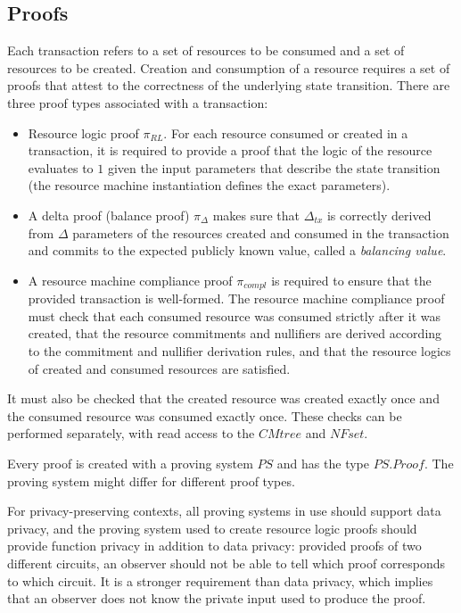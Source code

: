 \subsection{Proofs}

Each transaction refers to a set of resources to be consumed and a set of resources to be created. Creation and consumption of a resource requires a set of proofs that attest to the correctness of the underlying state transition. There are three proof types associated with a transaction:
\begin{itemize}
    \item Resource logic proof $\pi_{RL}$. For each resource consumed or created in a transaction, it is required to provide a proof that the logic of the resource evaluates to $1$ given the input parameters that describe the state transition (the resource machine instantiation defines the exact parameters).
    \item A delta proof (balance proof) $\pi_{\Delta}$ makes sure that $\Delta_{tx}$ is correctly derived from $\Delta$ parameters of the resources created and consumed in the transaction and commits to the expected publicly known value, called a \textit{balancing value}. 
    \item A resource machine compliance proof $\pi_{compl}$ is required to ensure that the provided transaction is well-formed. The resource machine compliance proof must check that each consumed resource was consumed strictly after it was created, that the resource commitments and nullifiers are derived according to the commitment and nullifier derivation rules, and that the resource logics of created and consumed resources are satisfied.
\end{itemize}

\begin{remark}\label{non-proof-checks}
    It must also be checked that the created resource was created exactly once and the consumed resource was consumed exactly once. These checks can be performed separately, with read access to the $CMtree$ and $NFset$.
\end{remark}

\begin{remark}\label{remark:proving-system-assumption}
Every proof is created with a proving system $PS$ and has the type $PS.Proof$. The proving system might differ for different proof types.
\end{remark}

\begin{remark}
    For privacy-preserving contexts, all proving systems in use should support data privacy, and the proving system used to create resource logic proofs should provide function privacy in addition to data privacy: provided proofs of two different circuits, an observer should not be able to tell which proof corresponds to which circuit. It is a stronger requirement than data privacy, which implies that an observer does not know the private input used to produce the proof.
\end{remark}

